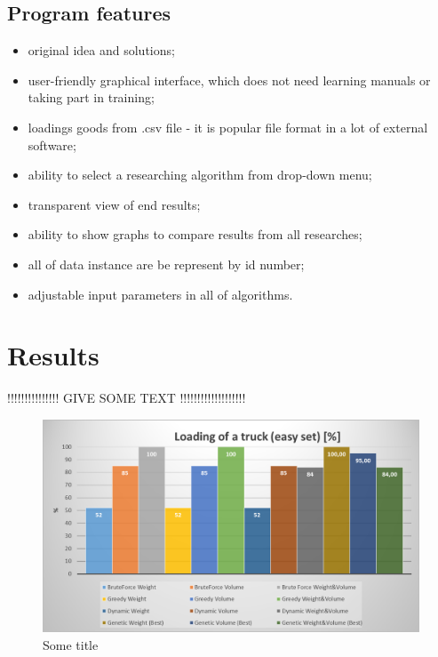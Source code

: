 \documentclass[conference,compsoc]{IEEEtran}
\begin{document}
\subsection{Program features}
\begin{itemize}
\item original idea and solutions;
\item user-friendly graphical interface, which does not need learning manuals or taking part in training;
\item loadings goods from .csv file - it is popular file format in a lot of external software; 
\item ability to select a researching algorithm from drop-down menu;
\item transparent view of end results;
\item ability to show graphs to compare results from all researches;
\item all of data instance are be represent by id number;
\item adjustable input parameters in all of algorithms.
\end{itemize}


\section{Results}

!!!!!!!!!!!!!!! GIVE SOME TEXT    !!!!!!!!!!!!!!!!!!!

\begin{figure}[H]
  \centering
  \includegraphics[width=\columnwidth]{image003.png}
  \caption{Some title}
\end{figure}
\end{document}
